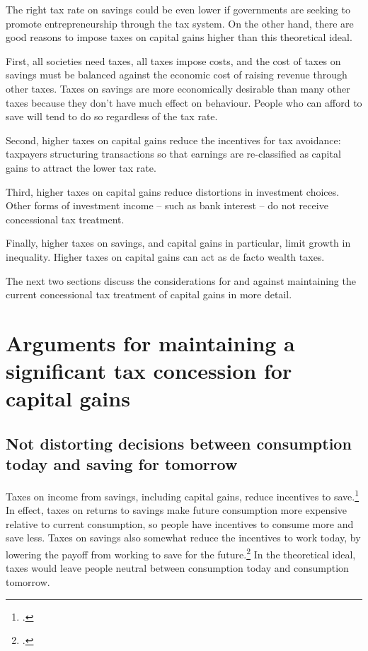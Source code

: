 \documentclass{grattanAlpha}\usepackage[]{graphicx}\usepackage[]{color}
\begin{document}
The right tax rate on savings could be even lower if governments are seeking to promote entrepreneurship through the tax system.
On the other hand, there are good reasons to impose taxes on capital gains higher than this theoretical ideal.

First, all societies need taxes, all taxes impose costs, and the cost of taxes on savings must be balanced against the economic cost of raising revenue through other taxes. Taxes on savings are more economically desirable than many other taxes because they don’t have much effect on behaviour. People who can afford to save will tend to do so regardless of the tax rate.

Second, higher taxes on capital gains reduce the incentives for tax avoidance: taxpayers structuring transactions so that earnings are re-classified as capital gains to attract the lower tax rate.

Third, higher taxes on capital gains reduce distortions in investment choices. Other forms of investment income – such as bank interest – do not receive concessional tax treatment. 

Finally, higher taxes on savings, and capital gains in particular, limit growth in inequality. Higher taxes on capital gains can act as de facto wealth taxes.  

The next two sections discuss the considerations for and against maintaining the current concessional tax treatment of capital gains in more detail.


\section{Arguments for maintaining a significant tax concession for capital gains}
\subsection{Not distorting decisions between consumption today and saving for tomorrow}
Taxes on income from savings, including capital gains, reduce incentives to save.\footcites[][32]{HenryTaxReview2010}[][58]{Treasury2015ReThink}[][295]{MirrleesAdamBesleyEtAl2011}  In effect, taxes on returns to savings make future consumption more expensive relative to current consumption, so people have incentives to consume more and save less. Taxes on savings also somewhat reduce the incentives to work today, by lowering the payoff from working to save for the future.\footcite[][12]{HenryTaxReview2010}  In the theoretical ideal, taxes would leave people neutral between consumption today and consumption tomorrow.
\end{document}
